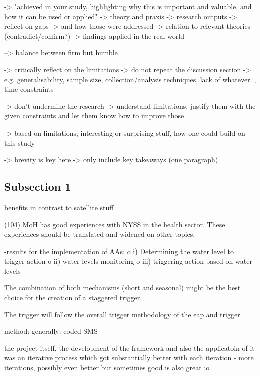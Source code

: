 -> "achieved in your study, highlighting why this is important and valuable, and how it can be used or applied"
-> theory and praxis
-> research outputs
-> reflect on gaps -> and how those were addressed
-> relation to relevant theories (contradict/confirm?)
-> findings applied in the real world

--> balance between firm but humble

->  critically reflect on the limitations 
-> do not repeat the discussion section
-> e.g. generalisability, sample size, collection/analysis techniques, lack of whatever.., time constraints

-> don't undermine the research
-> understand limitations, justify them with the given constraints and let them know how to improve those

-> based on limitations, interesting or surprising stuff, how one could build on this study


-> brevity is key here -> only include key takeaways (one paragraph)

\subsection{Subsection 1}

benefits in contrast to satellite stuff

(104) MoH has good experiences with NYSS in the health sector. These experiences should be translated and widened on other topics.



-results for the implementation of AAs:
o	i) Determining the water level to trigger action
o	ii) water levels monitoring
o	iii) triggering action based on water levels


The combination of both mechanisms (short and seasonal) might be the best choice for the creation of a staggered trigger.


The trigger will follow the overall trigger methodology of the \acrshort{eap} and 
trigger

method: generally: coded SMS



the project itself, the development of the framework and also the applicatoin of it was an iterative process which got substantially better with each iteration - more iterations, possibly even better but sometimes good is also great :o


